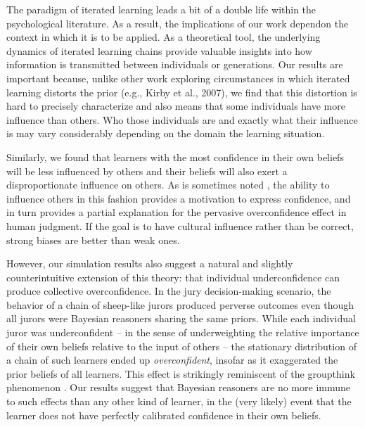 \documentclass[doc]{apa6}
\begin{document}
The paradigm of iterated learning leads a bit of a  double life within the psychological literature. As a result, the implications of our work dependon the context in which it is to be applied. As a theoretical tool, the underlying dynamics of iterated learning chains provide valuable insights into how information is transmitted between individuals or generations. %
Our results are important because, unlike other work exploring circumstances in which iterated learning distorts the prior (e.g., Kirby et al., 2007), we find that this distortion is hard to precisely characterize and also means that some individuals have more influence than others. Who those individuals are and exactly what their influence is may vary considerably depending on the domain the learning situation.


Similarly, we found that learners with the most confidence in their own beliefs will be less influenced by others and their beliefs will also exert a disproportionate influence on others. As is sometimes noted \parencite[e.g.,][]{russo_managing_1992}, the ability to influence others in this fashion provides a motivation to express confidence, and in turn provides a partial explanation for the pervasive overconfidence effect \parencite[e.g.,][]{lichtenstein_calibration_1977} in human judgment. If the goal is to have cultural influence rather than be correct, strong biases are better than weak ones.

However, our simulation results also suggest a natural and slightly counterintuitive extension of this theory: that individual underconfidence can produce collective overconfidence. In the jury decision-making scenario, the behavior of a chain of {\sc sheep}-like jurors produced perverse outcomes even though all jurors were Bayesian reasoners sharing the same priors. While each individual juror was underconfident -- in the sense of underweighting the relative importance of their own beliefs relative to the input of others -- the stationary distribution of a chain of such learners ended up {\it overconfident}, insofar as it exaggerated the prior beliefs of all learners. This effect is strikingly reminiscent of the groupthink phenomenon \parencite{janis1982groupthink,esser_alive_1998}. Our results suggest that Bayesian reasoners are no more immune to such effects than any other kind of learner, in the (very likely) event that the learner does not have perfectly calibrated confidence in their own beliefs.
\end{document}
